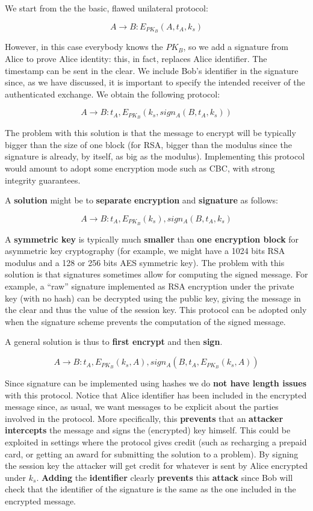 We start from the the basic, flawed unilateral protocol:

$$A \rightarrow B: E_{PK_B}(A, t_A, k_s)$$

However, in this case everybody knows the $PK_B$, so we add a signature from Alice to prove Alice identity: this, in fact, replaces Alice identifier. The timestamp can be sent in the clear. We include Bob’s identifier in the signature since, as we have discussed, it is important to specify the intended receiver of the authenticated exchange. We obtain the following protocol:

$$A \rightarrow B: t_A, E_{PK_B}( k_s,  sign_{A}( B, t_A, k_s )) $$

The problem with this solution is that the message to encrypt will be typically bigger than the size of one block (for RSA, bigger than the modulus since the signature is already, by itself, as big as the modulus). Implementing this protocol would amount to adopt some encryption mode such as CBC, with strong integrity guarantees.

A \textbf{solution} might be to \textbf{separate} \textbf{encryption} and \textbf{signature} as follows:

$$A \rightarrow B: t_A, E_{PK_B}(k_s), sign_{A}( B, t_A, k_s ) $$

A \textbf{symmetric key} is typically much \textbf{smaller} than \textbf{one encryption block} for asymmetric key cryptography (for example, we might have a 1024 bits RSA modulus and a 128 or 256 bits AES symmetric key). The problem with this solution is that signatures sometimes allow for computing the signed message. For example, a “raw” signature implemented as RSA encryption under the private key (with no hash) can be decrypted using the public key, giving the message in the clear and thus the value of the session key. This protocol can be adopted only when the signature scheme prevents the computation of the signed message.

A general solution is thus to \textbf{first encrypt} and then \textbf{sign}.

$$A \rightarrow B: t_A, E_{PK_B}(k_s,A), sign_{A}( B, t_A, E_{PK_B}(k_s,A))$$ 

Since signature can be implemented using hashes we do \textbf{not have length issues} with this protocol. Notice that Alice identifier has been included in the encrypted message since, as usual, we want messages to be explicit about the parties involved in the protocol. More specifically, this \textbf{prevents} that an \textbf{attacker} \textbf{intercepts} the message and signs the (encrypted) key himself. This could be exploited in settings where the protocol gives credit (such as recharging a prepaid card, or getting an award for submitting the solution to a problem). By signing the session key the attacker will get credit for whatever is sent by Alice encrypted under $k_s$. \textbf{Adding} the \textbf{identifier} clearly \textbf{prevents} this \textbf{attack} since Bob will check that the identifier of the signature is the same as the one included in the encrypted message.

